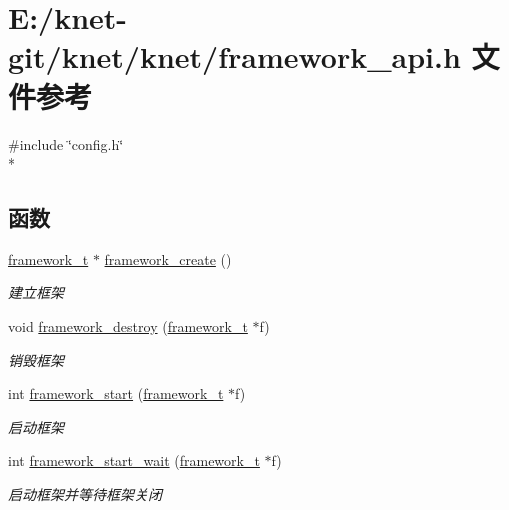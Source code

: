 \hypertarget{a00053}{}\section{E\+:/knet-\/git/knet/knet/framework\+\_\+api.h 文件参考}
\label{a00053}
{\ttfamily \#include \char`\"{}config.\+h\char`\"{}}\\*
\subsection*{函数}
\begin{DoxyCompactItemize}
\item 
\hyperlink{a00050_a6149d769f6f07ed14a40a271c95d8463_a6149d769f6f07ed14a40a271c95d8463}{framework\+\_\+t} $\ast$ \hyperlink{a00102_ga90b29a0c500209cb9b37437a32188a40_ga90b29a0c500209cb9b37437a32188a40}{framework\+\_\+create} ()
\begin{DoxyCompactList}\small\item\em 建立框架 \end{DoxyCompactList}\item 
void \hyperlink{a00102_gad1b6cb17014bfc515f8861bad3198e22_gad1b6cb17014bfc515f8861bad3198e22}{framework\+\_\+destroy} (\hyperlink{a00050_a6149d769f6f07ed14a40a271c95d8463_a6149d769f6f07ed14a40a271c95d8463}{framework\+\_\+t} $\ast$f)
\begin{DoxyCompactList}\small\item\em 销毁框架 \end{DoxyCompactList}\item 
int \hyperlink{a00102_ga23293faa7cc7d9f88ec73d4430a2355e_ga23293faa7cc7d9f88ec73d4430a2355e}{framework\+\_\+start} (\hyperlink{a00050_a6149d769f6f07ed14a40a271c95d8463_a6149d769f6f07ed14a40a271c95d8463}{framework\+\_\+t} $\ast$f)
\begin{DoxyCompactList}\small\item\em 启动框架 \end{DoxyCompactList}\item 
int \hyperlink{a00102_ga5fb7151fc13ce397884a7673b4fd319b_ga5fb7151fc13ce397884a7673b4fd319b}{framework\+\_\+start\+\_\+wait} (\hyperlink{a00050_a6149d769f6f07ed14a40a271c95d8463_a6149d769f6f07ed14a40a271c95d8463}{framework\+\_\+t} $\ast$f)
\begin{DoxyCompactList}\small\item\em 启动框架并等待框架关闭 \end{DoxyCompactList}\item 

\end{DoxyCompactItemize}
